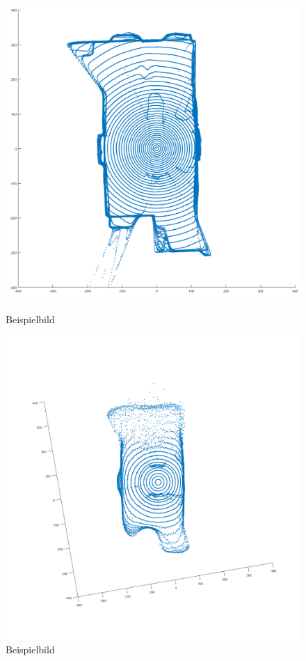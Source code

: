 \begin{figure}[htb]
	\centering
	\begin{minipage}[t]{0.45\linewidth}
		\centering
		\includegraphics[width=1.2\linewidth]{images/Validierung/Aufloesungen/mittel_vogel.png}
		\caption{Beispielbild}
	\end{minipage}
	\hfill
	\begin{minipage}[t]{0.45\linewidth}
		\centering
		\includegraphics[width=1.2\linewidth]{images/Validierung/VLX_vogel.png}
		\caption{Beispielbild}
	\end{minipage}
\end{figure}






